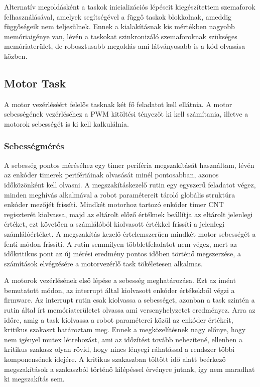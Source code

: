 Alternatív megoldásként a taskok inicializációs lépéseit kiegészítettem
szemaforok felhasználásával, amelyek segítségével a függő taskok blokkolnak,
ameddig függőségeik nem teljesülnek. Ennek a kialakításnak kis mértékben nagyobb
memóriaigénye van, lévén a taskokat szinkronizáló szemaforoknak szükséges
memóriaterület, de robosztusabb megoldás ami látványosabb is a kód olvasása
közben.

\subsection{Motor Task}

A motor vezérléséért felelős tasknak két fő feladatot kell ellátnia. A motor
sebességének vezérléséhez a PWM kitöltési tényezőt ki kell számítania, illetve a
motorok sebességét is ki kell kalkulálnia.

\subsubsection{Sebességmérés}

A sebesség pontos méréséhez egy timer periféria megszakítását használtam, lévén
az enkóder timerek perifériáinak olvasását minél pontosabban, azonos időközönként
kell olvasni. A megszakításkezelő rutin egy egyszerű feladatot végez, minden
meghívás alkalmával a robot paramétereit tároló globális struktúra enkóder
mezőjét frissíti. Mindkét motorhoz tartozó enkóder timer CNT  regiszterét
kiolvassa, majd az eltárolt előző értéknek beállítja az eltárolt jelenlegi
értéket, ezt követően a számlálóból kiolvasott értékkel frissíti a jelenlegi
számlálóértéket. A megszakítás kezelő értelemszerűen mindkét motor sebességét a
fenti módon frissíti. A rutin semmilyen többletfeladatot nem végez, mert az
időkritikus pont az új mérési eredmény pontos időben történő megszerzése, a
számítások elvégzésére a motorvezérlő task tökéletesen alkalmas.

\medskip

A motorok vezérlésének első lépése a sebesség meghatározása. Ezt az imént
bemutatott módon, az interrupt által kiolvasott enkóder értékekből végzi a
firmware. Az interrupt rutin csak kiolvassa a sebességet, azonban a task szintén
a rutin által írt memóriaterületet olvassa ami versenyhelyzetet eredményez. Arra
az időre, amig a task kiolvassa a robot paraméterei közül az enkóder értékeit,
kritikus szakaszt határoztam meg. Ennek a megközelítésnek nagy előnye, hogy nem
igényel mutex létrehozást, ami az időzítést tovább nehezítené, ellenben a
kritikus szakasz olyan rövid, hogy nincs lényegi ráhatással a rendszer többi
komponensének idejére. A kritikus szakaszban töltött idő alatt beérkező
megszakítások a szakaszból történő kilépéssel érvényre jutnak, így nem 
maradhat ki megszakítás sem.

